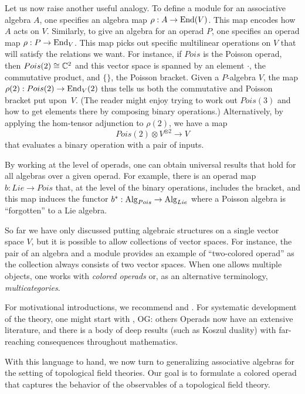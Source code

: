\documentclass[11pt]{amsart}
\def\owen#1{{\textcolor{violet!65!black}{OG: {#1}}}}
\begin{document}
Let us now raise another useful analogy.
To define a module for an associative algebra $A$, one specifies an algebra map $\rho: A \to {\rm End}(V)$.
This map encodes how $A$ acts on $V$.
Similarly, to give an algebra for an operad $P$, one specifies an operad map $\rho: P \to {\rm End}_V$.
This map picks out specific multilinear operations on $V$ that will satisfy the relations we want.
For instance, if $Pois$ is the Poisson operad, then $Pois(2) \cong \mathbb C^2$ and this vector space is spanned by an element $\cdot$, the commutative product, and $\{\}$, the Poisson bracket.
Given a $P$-algebra $V$, the map $\rho(2): Pois(2) \to {\rm End}_V(2)$ thus tells us both the commutative and Poisson bracket put upon~$V$.
(The reader might enjoy trying to work out $Pois(3)$ and how to get elements there by composing binary operations.)
Alternatively, by applying the hom-tensor adjunction to $\rho(2)$, we have a map
\[
Pois(2) \otimes V^{\otimes 2} \to V
\]
that evaluates a binary operation with a pair of inputs.

By working at the level of operads, one can obtain universal results that hold for all algebras over a given operad.
For example, there is an operad map $b: Lie \to Pois$ that, at the level of the binary operations, includes the bracket, 
and this map induces the functor $b^*: {\rm Alg}_{Pois} \to {\rm Alg}_{Lie}$ where a Poisson algebra is ``forgotten'' to a Lie algebra.

So far we have only discussed putting algebraic structures on a single vector space $V$,
but it is possible to allow collections of vector spaces.
For instance, the pair of an algebra and a module provides an example of ``two-colored operad'' as the collection always consists of two vector spaces.
When one allows multiple objects, one works with {\em colored operads} or, as an alternative terminology, {\em multicategories}.

\begin{rmk}
For motivational introductions, we recommend \cite{StashAMS} and \cite{Val12}.
For systematic development of the theory, one might start with \cite{LodVal}, \owen{others}
Operads now have an extensive literature, and there is a body of deep results (such as Koszul duality) with far-reaching consequences throughout mathematics.
\end{rmk}

With this language to hand, we now turn to generalizing associative algebras for the setting of topological field theories. 
Our goal is to formulate a colored operad that captures the behavior of the observables of a topological field theory.
\end{document}
